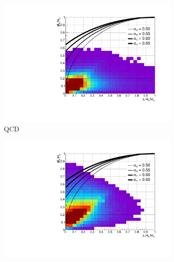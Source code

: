\begin{figure}[t!]
  \centering
  \begin{subfigure}[t]{.46\textwidth}
    \includegraphics[width=\textwidth]{Figs/alphat/alphat_correlation_QCD_ge4j_done3.pdf}
    \caption{QCD}
    \label{fig:alphat_corr_qcd}
  \end{subfigure}
  \begin{subfigure}[t]{.46\textwidth}
    \includegraphics[width=\textwidth]{Figs/alphat/alphat_correlation_Zinv_ge4j_done3.pdf}
    \caption{\zinv}
    \label{fig:alphat_corr_zinv}
  \end{subfigure}\\
  \begin{subfigure}[t]{.46\textwidth}

\end{subfigure}
\end{figure}
